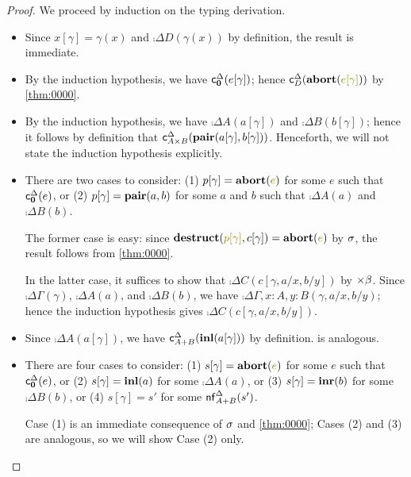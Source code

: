 \documentclass[a4paper]{article}
\begin{document}
\begin{proof}
  We proceed by induction on the typing derivation.
  \begin{itemize}
  \item[\rVar] Since $x[\gamma] = \gamma(x)$ and $\comp{\Delta}{D}(\gamma(x))$ by definition, the result is immediate.
  \item[\rEmpE] By the induction hypothesis, we have $\operatorname{\mathsf{c}}^{\Delta}_{\mathbf{0}}(e[\gamma])$; hence $\comp{\Delta}{D}(\tmAbort{e[\gamma]})$ by \cref{thm:0000}.
  \item[\rProdI] By the induction hypothesis, we have $\comp{\Delta}{A}(a[\gamma])$ and $\comp{\Delta}{B}(b[\gamma])$; hence it follows by definition that $\operatorname{\mathsf{c}}^{\Delta}_{A \times B}(\operatorname{\mathbf{pair}}(a[\gamma],b[\gamma]))$.
    Henceforth, we will not state the induction hypothesis explicitly.
  \item[\rProdE] There are two cases to consider: (1) $p[\gamma] = \tmAbort{e}$ for some $e$ such that $\operatorname{\mathsf{c}}^{\Delta}_{\mathbf{0}}(e)$, or (2) $p[\gamma] = \operatorname{\mathbf{pair}}(a,b)$ for some $a$ and $b$ such that $\comp{\Delta}{A}(a)$ and $\comp{\Delta}{B}(b)$.

    The former case is easy: since $\tmDestruct{p[\gamma]}{c[\gamma]} = \tmAbort{e}$ by $\textsc{$\sigma$}$, the result follows from \cref{thm:0000}.

    In the latter case, it suffices to show that $\comp{\Delta}{C}(c[\gamma,a/x,b/y])$ by $\textsc{$\times\beta$}$.
    Since $\comp{\Delta}{\Gamma}(\gamma)$, $\comp{\Delta}{A}(a)$, and $\comp{\Delta}{B}(b)$, we have $\comp{\Delta}{\Gamma,x : A,y : B}(\gamma,a/x,b/y)$; hence the induction hypothesis gives $\comp{\Delta}{C}(c[\gamma,a/x,b/y])$.
  \item[\rSumIl] Since $\comp{\Delta}{A}(a[\gamma])$, we have $\operatorname{\mathsf{c}}^{\Delta}_{A+B}(\operatorname{\mathbf{inl}}(a[\gamma]))$ by definition.
    \rSumIr is analogous.
  \item[\rSumE] There are four cases to consider: (1) $s[\gamma] = \tmAbort{e}$ for some $e$ such that $\operatorname{\mathsf{c}}^{\Delta}_{\mathbf{0}}(e)$, or (2) $s[\gamma] = \operatorname{\mathbf{inl}}(a)$ for some $\comp{\Delta}{A}(a)$, or (3) $s[\gamma] = \operatorname{\mathbf{inr}}(b)$ for some $\comp{\Delta}{B}(b)$, or (4) $s[\gamma] = s'$ for some $\operatorname{\mathsf{nf}}^{\Delta}_{A+B}(s')$.

    Case (1) is an immediate consequence of $\textsc{$\sigma$}$ and \cref{thm:0000}; Cases (2) and (3) are analogous, so we will show Case (2) only.
    

\end{itemize}
\end{proof}
\end{document}
